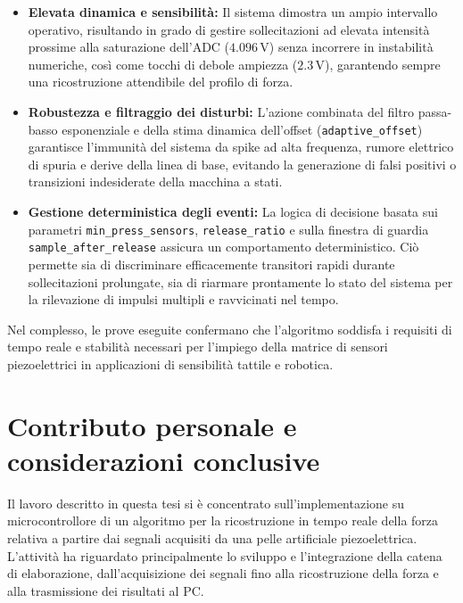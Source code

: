 \documentclass[10pt, a4paper]{article}
\begin{document}
                \begin{itemize}
                    \item \textbf{Elevata dinamica e sensibilità:} Il sistema dimostra un ampio intervallo operativo, risultando in grado di gestire 
                    sollecitazioni ad elevata intensità prossime alla saturazione dell'ADC ($4.096\,\mathrm{V}$) senza incorrere in instabilità 
                    numeriche, così come tocchi di debole ampiezza ($2.3\,\mathrm{V}$), garantendo sempre una ricostruzione attendibile del profilo 
                    di forza.
                    
                    \item \textbf{Robustezza e filtraggio dei disturbi:} L'azione combinata del filtro passa-basso esponenziale e della stima 
                    dinamica dell'offset (\texttt{adaptive\_offset}) garantisce l'immunità del sistema da spike ad alta frequenza, rumore elettrico 
                    di spuria e derive della linea di base, evitando la generazione di falsi positivi o transizioni indesiderate della macchina a stati.
                    
                    \item \textbf{Gestione deterministica degli eventi:} La logica di decisione basata sui parametri \texttt{min\_press\_sensors}, 
                    \texttt{release\_ratio} e sulla finestra di guardia \texttt{sample\_after\_release} assicura un comportamento deterministico. 
                    Ciò permette sia di discriminare efficacemente transitori rapidi durante sollecitazioni prolungate, sia di riarmare prontamente 
                    lo stato del sistema per la rilevazione di impulsi multipli e ravvicinati nel tempo.
                \end{itemize}

            Nel complesso, le prove eseguite confermano che l'algoritmo soddisfa i requisiti di tempo reale e stabilità necessari per l'impiego della 
            matrice di sensori piezoelettrici in applicazioni di sensibilità tattile e robotica.
    \newpage                
    \section{Contributo personale e considerazioni conclusive}

            Il lavoro descritto in questa tesi si è concentrato sull'implementazione su microcontrollore di un algoritmo per la ricostruzione in tempo reale
            della forza relativa a partire dai segnali acquisiti da una pelle artificiale piezoelettrica. L'attività ha riguardato principalmente lo sviluppo 
            e l'integrazione della catena di elaborazione, dall'acquisizione dei segnali fino alla ricostruzione della forza e alla trasmissione dei risultati al PC.
\end{document}
